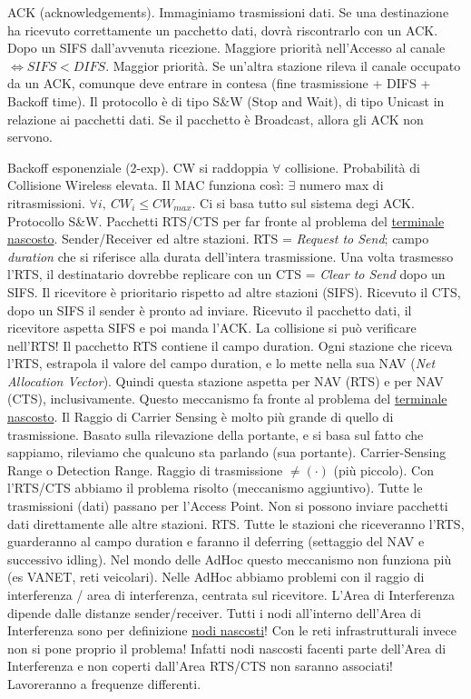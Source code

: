 ACK (acknowledgements). Immaginiamo trasmissioni dati. Se una destinazione ha ricevuto correttamente un pacchetto dati, dovrà riscontrarlo con un ACK. Dopo un SIFS dall'avvenuta ricezione. Maggiore priorità nell'Accesso al canale $\iff SIFS < DIFS$. Maggior priorità. Se un'altra stazione rileva il canale occupato da un ACK, comunque deve entrare in contesa (fine trasmissione + DIFS + Backoff time). Il protocollo è di tipo S\&W (Stop and Wait), di tipo Unicast in relazione ai pacchetti dati. Se il pacchetto è Broadcast, allora gli ACK non servono.

Backoff esponenziale (2-exp). CW si raddoppia $\forall$ collisione. Probabilità di Collisione Wireless elevata. Il MAC funziona così: $\exists$ numero max di ritrasmissioni. $\forall i,\ CW_i\leq CW_{max}$. Ci si basa tutto sul sistema degi ACK. Protocollo S\&W.
Pacchetti RTS/CTS per far fronte al problema del \underline{terminale nascosto}. Sender/Receiver ed altre stazioni. RTS = \textit{Request to Send}; campo \textit{duration} che si riferisce alla durata dell'intera trasmissione. Una volta trasmesso l'RTS, il destinatario dovrebbe replicare con un CTS = \textit{Clear to Send} dopo un SIFS. Il ricevitore è prioritario rispetto ad altre stazioni (SIFS). Ricevuto il CTS, dopo un SIFS il sender è pronto ad inviare. Ricevuto il pacchetto dati, il ricevitore aspetta SIFS e poi manda l'ACK. La collisione si può verificare nell'RTS! Il pacchetto RTS contiene il campo duration. Ogni stazione che riceva l'RTS, estrapola il valore del campo duration, e lo mette nella sua NAV (\textit{Net Allocation Vector}). Quindi questa stazione aspetta per NAV (RTS) e per NAV (CTS), inclusivamente. Questo meccanismo fa fronte al problema del \underline{terminale nascosto}. Il Raggio di Carrier Sensing è molto più grande di quello di trasmissione. Basato sulla rilevazione della portante, e si basa sul fatto che sappiamo, rileviamo che qualcuno sta parlando (sua portante). Carrier-Sensing Range o Detection Range. Raggio di trasmissione $\neq (\mathord{\cdot})$ (più piccolo). Con l'RTS/CTS abbiamo il problema risolto (meccanismo aggiuntivo). Tutte le trasmissioni (dati) passano per l'Access Point. Non si possono inviare pacchetti dati direttamente alle altre stazioni. RTS. Tutte le stazioni che riceveranno l'RTS, guarderanno al campo duration e faranno il deferring (settaggio del NAV e successivo idling). Nel mondo delle AdHoc questo meccanismo non funziona più (es VANET, reti veicolari). Nelle AdHoc abbiamo problemi con il raggio di interferenza / area di interferenza, centrata sul ricevitore. L'Area di Interferenza dipende dalle distanze sender/receiver. Tutti i nodi all'interno dell'Area di Interferenza sono per definizione \underline{nodi nascosti}! Con le reti infrastrutturali invece non si pone proprio il problema! Infatti nodi nascosti facenti parte dell'Area di Interferenza e non coperti dall'Area RTS/CTS non saranno associati! Lavoreranno a frequenze differenti.

